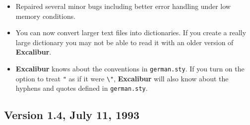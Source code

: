 \documentclass[11pt,titlepage]{article}
\newcommand{\ex}{\textbf{Excalibur}}
\begin{document}
\begin{itemize}

\item Repaired several minor bugs including better error handling
  under low memory conditions.

\item You can now convert larger text files into dictionaries.  If you
  create a really large dictionary you may not be able to read it with
  an older version of \ex{}.

\item \ex{} knows about the conventions in \texttt{german.sty}.  If
  you turn on the option to treat \texttt{"} as if it were \verb+\"+,
  \ex{} will also know about the hyphens and quotes defined in
  \texttt{german.sty}.

\end{itemize}

\subsection{Version 1.4, July 11, 1993}
\end{document}
